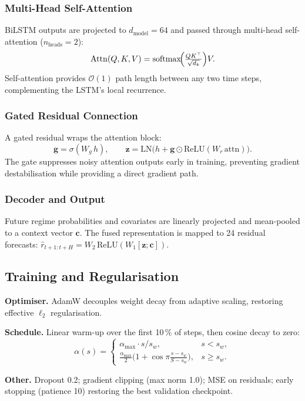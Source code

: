 \documentclass[10pt,a4paper,twocolumn]{article}
\begin{document}
\subsubsection{Multi-Head Self-Attention}
BiLSTM outputs are projected to $d_{\mathrm{model}}=64$ and passed through
multi-head self-attention ($n_{\mathrm{heads}}=2$):
\[
  \mathrm{Attn}(Q,K,V)=\mathrm{softmax}\!\Bigl(\tfrac{QK^\top}{\sqrt{d_k}}\Bigr)V.
\]
Self-attention provides $\mathcal{O}(1)$ path length between any two time
steps, complementing the LSTM's local recurrence.

\subsubsection{Gated Residual Connection}
A gated residual wraps the attention block:
\[
  \mathbf{g} = \sigma(W_g\,h), \qquad
  \mathbf{z} = \mathrm{LN}\!\bigl(h + \mathbf{g}\odot\mathrm{ReLU}(W_r\,\mathrm{attn})\bigr).
\]
The gate suppresses noisy attention outputs early in training, preventing
gradient destabilisation while providing a direct gradient path.

\subsubsection{Decoder and Output}
Future regime probabilities and covariates are linearly projected and
mean-pooled to a context vector $\mathbf{c}$.
The fused representation is mapped to 24 residual forecasts:
$\hat{r}_{t+1:t+H}=W_2\,\mathrm{ReLU}(W_1[\mathbf{z};\mathbf{c}])$.

\subsection{Training and Regularisation}

\textbf{Optimiser.}
AdamW decouples weight decay from adaptive scaling, restoring effective
$\ell_2$ regularisation.

\textbf{Schedule.}
Linear warm-up over the first 10\,\% of steps, then cosine decay to zero:
\[
  \alpha(s)=\begin{cases}
    \alpha_{\max}\cdot s/s_w, & s < s_w,\\[2pt]
    \tfrac{\alpha_{\max}}{2}\bigl(1+\cos\pi\tfrac{s-s_w}{S-s_w}\bigr), & s\ge s_w.
  \end{cases}
\]

\textbf{Other.}
Dropout 0.2; gradient clipping (max norm 1.0); MSE on residuals;
early stopping (patience 10) restoring the best validation checkpoint.
\end{document}
